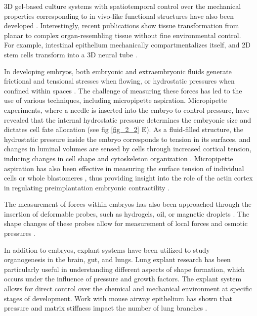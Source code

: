 3D gel-based culture systems with spatiotemporal control over the mechanical properties corresponding to in vivo-like functional structures have also been developed \cite{torras2018}. Interestingly, recent publications show tissue transformation from planar to complex organ-resembling tissue without fine environmental control. For example, intestinal epithelium mechanically compartmentalizes itself, and 2D stem cells transform into a 3D neural tube \cite{perez-gonzalez2021, karzbrun2021}.

In developing embryos, both embryonic and extraembryonic fluids generate frictional and tensional stresses when flowing, or hydrostatic pressures when confined within spaces \cite{vianello2019, chan2020}. The challenge of measuring these forces has led to the use of various techniques, including micropipette aspiration. Micropipette experiments, where a needle is inserted into the embryo to control pressure, have revealed that the internal hydrostatic pressure determines the embryonic size and dictates cell fate allocation \cite{chan2019} (see fig \ref{fig_2_2} E). As a fluid-filled structure, the hydrostatic pressure inside the embryo corresponds to tension in its surfaces, and changes in luminal volumes are sensed by cells through increased cortical tension, inducing changes in cell shape and cytoskeleton organization \cite{chan2019, choudhury2022}. Micropipette aspiration has also been effective in measuring the surface tension of individual cells or whole blastomeres \cite{dumortier2019}, thus providing insight into the role of the actin cortex in regulating preimplantation embryonic contractility \cite{ozguc2022, firmin2022}.

The measurement of forces within embryos has also been approached through the insertion of deformable probes, such as hydrogels, oil, or magnetic droplets \cite{dolega2017, campas2014, serwane2017}. The shape changes of these probes allow for measurement of local forces and osmotic pressures \cite{mongera2023}.

In addition to embryos, explant systems have been utilized to study organogenesis in the brain, gut, and lungs. Lung explant research has been particularly useful in understanding different aspects of shape formation, which occurs under the influence of pressure and growth factors. The explant system allows for direct control over the chemical and mechanical environment at specific stages of development. Work with mouse airway epithelium has shown that pressure and matrix stiffness impact the number of lung branches \cite{palmer2021, varner2015, nelson2017}.

